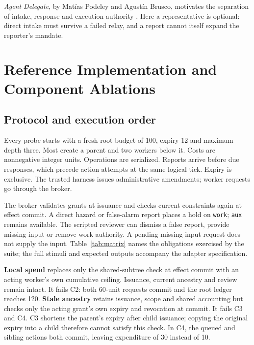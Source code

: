 \documentclass[11pt,letterpaper]{article}
\begin{document}
\emph{Agent Delegate}, by Matías Podeley and Agustín Brusco, motivates the separation
of intake, response and execution authority \citep{delegate2026}. Here a representative
is optional: direct intake must survive a failed relay, and a report cannot itself
expand the reporter's mandate.

\clearpage
\section{Reference Implementation and Component Ablations}
\subsection{Protocol and execution order}
Every probe starts with a fresh root budget of 100, expiry 12 and maximum depth
three. Most create a parent and two workers below it. Costs are nonnegative integer
units. Operations are serialized. Reports arrive before due responses, which precede
action attempts at the same logical tick. Expiry is exclusive. The trusted harness
issues administrative amendments; worker requests go through the broker.

The broker validates grants at issuance and checks current constraints again at
effect commit. A direct hazard or false-alarm report places a hold on \texttt{work};
\texttt{aux} remains available. The scripted reviewer can dismiss a false report,
provide missing input or remove work authority. A pending missing-input request does
not supply the input. Table~\ref{tab:matrix} names the obligations exercised by the
suite; the full stimuli and expected outputs accompany the adapter specification.

\begin{table}[htbp]
\centering\small
\caption{Acceptance matrix. PASS means the complete expected output sequence matches,
including positive controls and expenditure. Columns are a reference and two isolated
component removals, not competing production systems.}
\label{tab:matrix}
\end{table}

\textbf{Local spend} replaces only the shared-subtree check at effect commit with
an acting worker's own cumulative ceiling. Issuance, current ancestry and review
remain intact. It fails C2: both 60-unit requests commit and the root ledger reaches
120. \textbf{Stale ancestry} retains issuance, scope and shared accounting but checks
only the acting grant's own expiry and revocation at commit. It fails C3 and C4.
C3 shortens the parent's expiry after child issuance; copying the original expiry
into a child therefore cannot satisfy this check. In C4, the queued and sibling
actions both commit, leaving expenditure of 30 instead of 10.
\end{document}
